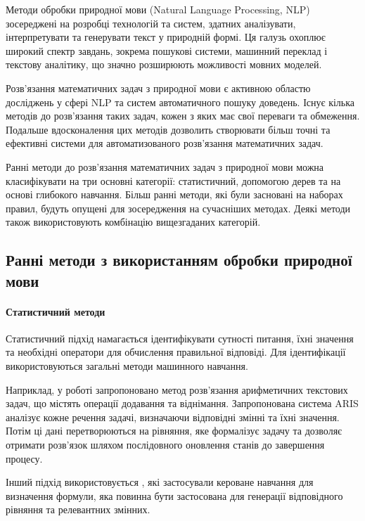 Методи обробки природної мови (Natural Language Processing, NLP) зосереджені на розробці технологій та систем, здатних аналізувати, інтерпретувати та генерувати текст у природній формі. Ця галузь охоплює широкий спектр завдань, зокрема пошукові системи, машинний переклад і текстову аналітику, що значно розширюють можливості мовних моделей.

Розв'язання математичних задач з природної мови є активною областю досліджень у сфері NLP та систем автоматичного пошуку доведень. Існує кілька методів до розв'язання таких задач, кожен з яких має свої переваги та обмеження. Подальше вдосконалення цих методів дозволить створювати більш точні та ефективні системи для автоматизованого розв'язання математичних задач.

Ранні методи до розв'язання математичних задач з природної мови можна класифікувати на три основні категорії: статистичний, допомогою дерев та на основі глибокого навчання. Більш ранні методи, які були засновані на наборах правил, будуть опущені для зосередження на сучасніших методах. Деякі методи також використовують комбінацію вищезгаданих категорій.

\subsection{Ранні методи з використанням обробки природної мови}

\paragraph{Статистичний методи}
Статистичний підхід намагається ідентифікувати сутності питання, їхні значення та необхідні оператори для обчислення правильної відповіді. Для ідентифікації використовуються загальні методи машинного навчання.

Наприклад, у роботі \cite{hosseini-etal-2014-learning} запропоновано метод розв’язання арифметичних текстових задач, що містять операції додавання та віднімання. Запропонована система ARIS аналізує кожне речення задачі, визначаючи відповідні змінні та їхні значення. Потім ці дані перетворюються на рівняння, яке формалізує задачу та дозволяє отримати розв’язок шляхом послідовного оновлення станів до завершення процесу.

Інший підхід використовується \cite{mitra-baral-2016-learning}, які застосували кероване навчання для визначення формули, яка повинна бути застосована для генерації відповідного рівняння та релевантних змінних.


